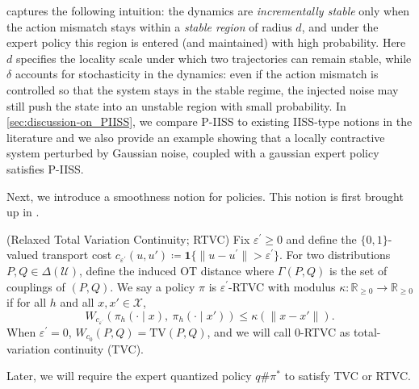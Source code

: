 \documentclass{article}
\newcommand{\arxiv}[1]{\iftoggle{icml}{}{#1}}
\newcommand{\icml}[1]{\iftoggle{icml}{#1}{}}
\begin{document}
 captures the following intuition: the dynamics are \emph{incrementally stable} only when the action mismatch stays within a \emph{stable region} of radius $d$, and under the expert policy this region is entered (and maintained) with high probability. Here $d$ specifies the locality scale under which two trajectories can remain stable, while $\delta$ accounts for stochasticity in the dynamics: even if the action mismatch is controlled so that the system stays in the stable regime, the injected noise may still push the state into an unstable region with small probability. In \cref{sec:discussion-on_PIISS}, we compare P-IISS to existing IISS-type notions in the literature and we also provide an example showing that a locally contractive system perturbed by Gaussian noise, coupled with a gaussian expert policy satisfies P-IISS.

Next, we introduce a smoothness notion for policies. This notion is first brought up in \citet{block2023provable}.

\begin{definition}\textnormal{(Relaxed Total Variation Continuity; RTVC)} Fix $\varepsilon^\prime\ge 0$ and define the $\{0,1\}$-valued transport cost $c_{\varepsilon^\prime}(u,u') \coloneqq  \mathbf 1\{ \|u-u^\prime\|> \varepsilon^\prime\}$. For two distributions $P,Q\in\Delta(\mathcal U)$, define the induced OT distance 
\icml{
\begin{align*} 
W_{c_{\varepsilon^\prime}}(P,Q) &\coloneqq  \inf_{\mu\in\Gamma(P,Q)} \mathbb E_{\mu}\big[c_{\varepsilon^\prime}(U,U')\big]\\
&= \inf_{\mu\in\Gamma(P,Q)} \mu\left( \|U-U'\|>\varepsilon^\prime \right), 
\end{align*} 
}
\arxiv{
\begin{align*}
    W_{c_{\varepsilon^\prime}}(P,Q) &\coloneqq  \inf_{\mu\in\Gamma(P,Q)} \mathbb E_{\mu}\big[c_{\varepsilon^\prime}(U,U')\big]= \inf_{\mu\in\Gamma(P,Q)} \mu\left( \|U-U'\|>\varepsilon^\prime \right), 
\end{align*}
}
where $\Gamma(P,Q)$ is the set of couplings of $(P,Q)$. We say a policy $\pi$ is $\varepsilon^\prime$-RTVC with modulus $\kappa:\mathbb R_{\geq0}\rightarrow \mathbb R_{\geq0}$ if for all $h$ and all $x,x'\in\mathcal X$, 
\begin{equation*}
W_{c_{\varepsilon^\prime}}\left(\pi_h(\cdot\mid x),\ \pi_h(\cdot\mid x')\right) \le \kappa\left(\|x-x'\|\right).
\end{equation*}
When $\varepsilon^\prime=0$, $W_{c_0}(P,Q)=\mathrm{TV}(P,Q)$, and we will call $0$-RTVC as total-variation continuity (TVC).

\end{definition}
Later, we will require the expert quantized policy $q\#\pi^*$ to satisfy TVC or RTVC. 
\end{document}

